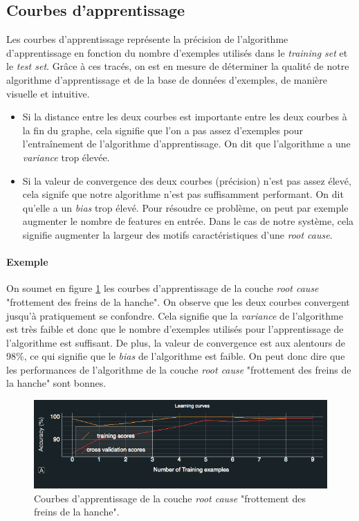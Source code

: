 \subsection{Courbes d'apprentissage}
\label{Industrialisation du produit: Performances de la solution:Courbes d'apprentissage}
Les courbes d'apprentissage représente la précision de l'algorithme d'apprentissage en fonction du nombre d'exemples utilisés dans le \emph{training set} et le \emph{test set}. Grâce à ces tracés, on est en mesure de déterminer la qualité de notre algorithme d'apprentissage et de la base de données d'exemples, de manière visuelle et intuitive. 
\begin{itemize}
	\item Si la distance entre les deux courbes est importante entre les deux courbes à la fin du graphe, cela signifie que l'on a pas assez d'exemples pour l'entraînement de l'algorithme d'apprentissage. On dit que l'algorithme a une \emph{variance} trop élevée. 
	\item Si la valeur de convergence des deux courbes (précision) n'est pas assez élevé, cela signife que notre algorithme n'est pas suffisamment performant. On dit qu'elle a un \emph{bias} trop élevé. Pour résoudre ce problème, on peut par exemple augmenter le nombre de features en entrée. Dans le cas de notre système, cela signifie augmenter la largeur des motifs caractéristiques d'une \emph{root cause}.
\end{itemize}

\paragraph{Exemple}
On soumet en figure \ref{fig:Courbes d'apprentissage} les courbes d'apprentissage de la couche \emph{root cause} "frottement des freins de la hanche". On observe que les deux courbes convergent jusqu'à pratiquement se confondre. Cela signifie que la \emph{variance} de l'algorithme est très faible et donc que le nombre d'exemples utilisés pour l'apprentissage de l'algorithme est suffisant. De plus, la valeur de convergence est aux alentours de 98\%, ce qui signifie que le \emph{bias} de l'algorithme est faible. On peut donc dire que les performances de l'algorithme de la couche \emph{root cause} "frottement des freins de la hanche" sont bonnes. 

\begin{figure}[h]
\centering\includegraphics[width=12cm]{images/courbe_apprentissage.png}
\caption[Courbes d'apprentissage]{Courbes d'apprentissage de la couche \emph{root cause} "frottement des freins de la hanche".}
\label{fig:Courbes d'apprentissage}
\end{figure}